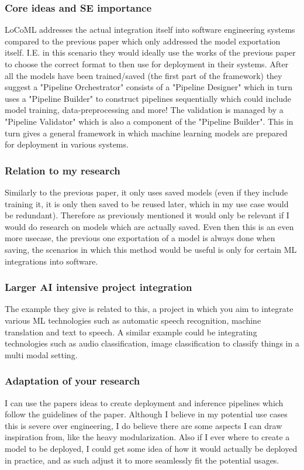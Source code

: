 \documentclass{article}
\begin{document}
\subsubsection{Core ideas and SE importance}
LoCoML addresses the actual integration itself into software engineering systems compared to the previous paper which only addressed the model exportation itself. I.E. in this scenario they would ideally use the works of the previous paper to choose the correct format to then use for deployment in their systems. After all the models have been trained/saved (the first part of the framework) they suggest a "Pipeline Orchestrator" consists of a "Pipeline Designer" which in turn uses a "Pipeline Builder" to construct pipelines sequentially which could include model training, data-preprocessing and more! The validation is managed by a "Pipeline Validator" which is also a component of the "Pipeline Builder". This in turn gives a general framework in which machine learning models are prepared for deployment in various systems.

\subsubsection{Relation to my research}
Similarly to the previous paper, it only uses saved models (even if they include training it, it is only then saved to be reused later, which in my use case would be redundant). Therefore as previously mentioned it would only be relevant if I would do research on models which are actually saved. Even then this is an even more usecase, the previous one exportation of a model is always done when saving, the scenarios in which this method would be useful is only for certain ML integrations into software.

\subsubsection{Larger AI intensive project integration}
The example they give is related to this, a project in which you aim to integrate various ML technologies such as automatic speech recognition, machine translation and text to speech. A similar example could be integrating technologies such as audio classification, image classification to classify things in a multi modal setting.

\subsubsection{Adaptation of your research}
I can use the papers ideas to create deployment and inference pipelines which follow the guidelines of the paper. Although I believe in my potential use cases this is severe over engineering, I do believe there are some aspects I can draw inspiration from, like the heavy modularization. Also if I ever where to create a model to be deployed, I could get some idea of how it would actually be deployed in practice, and as such adjust it to more seamlessly fit the potential usages.
\end{document}
